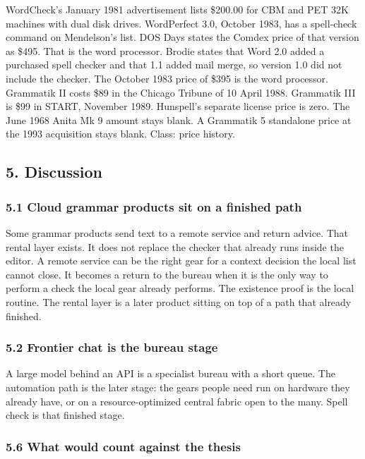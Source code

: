 \documentclass[
  10pt,
]{article}
\begin{document}
WordCheck's January 1981 advertisement lists \$200.00 for CBM and PET
32K machines with dual disk drives. WordPerfect 3.0, October 1983, has a
spell-check command on Mendelson's list. DOS Days states the Comdex
price of that version as \$495. That is the word processor. Brodie
states that Word 2.0 added a purchased spell checker and that 1.1 added
mail merge, so version 1.0 did not include the checker. The October 1983
price of \$395 is the word processor. Grammatik II costs \$89 in the
Chicago Tribune of 10 April 1988. Grammatik III is \$99 in START,
November 1989. Hunspell's separate license price is zero. The June 1968
Anita Mk 9 amount stays blank. A Grammatik 5 standalone price at the
1993 acquisition stays blank. Class: price history.

\subsection{5. Discussion}\label{discussion}

\subsubsection{5.1 Cloud grammar products sit on a finished
path}\label{cloud-grammar-products-sit-on-a-finished-path}

Some grammar products send text to a remote service and return advice.
That rental layer exists. It does not replace the checker that already
runs inside the editor. A remote service can be the right gear for a
context decision the local list cannot close. It becomes a return to the
bureau when it is the only way to perform a check the local gear already
performs. The existence proof is the local routine. The rental layer is
a later product sitting on top of a path that already finished.

\subsubsection{5.2 Frontier chat is the bureau
stage}\label{frontier-chat-is-the-bureau-stage}

A large model behind an API is a specialist bureau with a short queue.
The automation path is the later stage: the gears people need run on
hardware they already have, or on a resource-optimized central fabric
open to the many. Spell check is that finished stage.

\subsubsection{5.6 What would count against the
thesis}\label{what-would-count-against-the-thesis}
\end{document}
